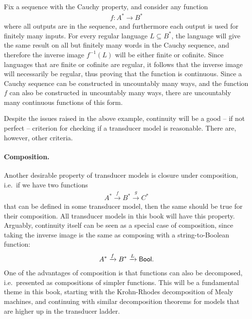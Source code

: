 \begin{myexample}
Fix a sequence with the Cauchy property, and consider any function 
    \begin{align*}
    f : A^* \to B^*
    \end{align*}
    where all outputs are in the sequence, and furthermore each output is used for finitely many inputs. For every regular language $L \subseteq B^*$, the language will give the same result on all but finitely many words in the Cauchy sequence, and therefore the inverse image $f^{-1}(L)$ will be either finite or cofinite. Since languages that are finite or cofinite are regular, it follows that the inverse image will necessarily be regular, thus proving that the function is continuous. Since a Cauchy sequence can be constructed in uncountably many ways, and the function $f$ can also be constructed in uncountably many ways, there are uncountably many continuous functions of this form.
\end{myexample}

Despite the issues raised in the above example, continuity will be a good -- if not perfect -- criterion for checking if a transducer model is reasonable.  There are, however, other criteria.

\paragraph*{Composition.} Another desirable property of transducer models is closure under composition, i.e.~if we have two functions 
\begin{align*}
A^* 
\xrightarrow f 
B^* 
\xrightarrow g 
C^*
\end{align*}
that can be defined in some transducer model, then the same should be true for their composition. All transducer models in this book will have this property.   Arguably, continuity itself can be seen as a special case of composition, since taking the inverse image is the same as composing with a string-to-Boolean function: \begin{align*}
A^* 
\xrightarrow f 
B^* 
\xrightarrow L
\mathsf{Bool}.
\end{align*} 
One of the advantages of composition is that functions can also be decomposed, i.e.~presented as compositions of simpler functions. This will be a fundamental theme in this book, starting with the Krohn-Rhodes decomposition of Mealy machines, and continuing with similar  decomposition theorems for models that are  higher up in the transducer ladder. 

